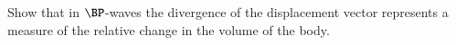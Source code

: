 % 
% 
% 
% 
% 
% 
% 
% 
% 
% 
% 
% 
\begin{Exercise}[title={$\BP$-waves, $\BS$-waves, and Love-waves}, label={problem:elastic:displacements:midtermQ1a}]

Show that in $\BP$-waves the divergence of the displacement vector represents a measure of the relative change in the volume of the body.
\end{Exercise}

